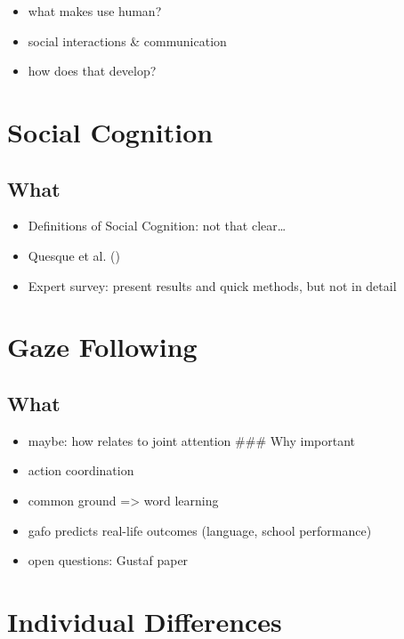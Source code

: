 \documentclass[
]{scrbook}
\providecommand{\tightlist}{%
  \setlength{\itemsep}{0pt}\setlength{\parskip}{0pt}}
\begin{document}
\begin{itemize}
\tightlist
\item
  what makes use human?
\item
  social interactions \& communication
\item
  how does that develop?
\end{itemize}

\section{Social Cognition}\label{social-cognition}

\subsection{What}\label{what}

\begin{itemize}
\tightlist
\item
  Definitions of Social Cognition: not that clear\ldots{}
\item
  Quesque et al. ()
\item
  Expert survey: present results and quick methods, but not in detail
\end{itemize}

\section{Gaze Following}\label{gaze-following}

\subsection{What}\label{what-1}

\begin{itemize}
\tightlist
\item
  maybe: how relates to joint attention
  \#\#\# Why important
\item
  action coordination
\item
  common ground =\textgreater{} word learning
\item
  gafo predicts real-life outcomes (language, school performance)
\item
  open questions: Gustaf paper
\end{itemize}

\section{Individual Differences}\label{individual-differences}
\end{document}
